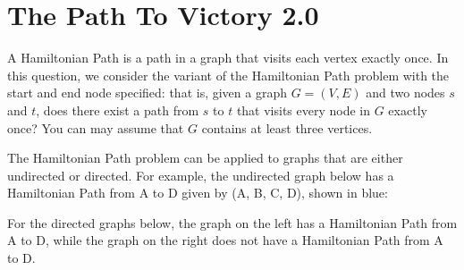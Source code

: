 \documentclass[11pt,fleqn]{exam}
\begin{document}
	\clearpage

    
\section{The Path To Victory 2.0}

A Hamiltonian Path is a path in a graph that visits each vertex exactly once. In this question, we consider the variant of the Hamiltonian Path problem with the start and end node specified: that is, given a graph $G=(V,E)$ and two nodes $s$ and $t$, does there exist a path from $s$ to $t$ that visits every node in $G$ exactly once? You can may assume that $G$ contains at least three vertices.

The Hamiltonian Path problem can be applied to graphs that are either undirected or directed. For example, the undirected graph below has a Hamiltonian Path from A to D given by (A, B, C, D), shown in blue:

\begin{center}
\end{center}

For the directed graphs below, the graph on the left has a Hamiltonian Path from A to D, while the graph on the right does not have a Hamiltonian Path from A to D.
\end{document}
